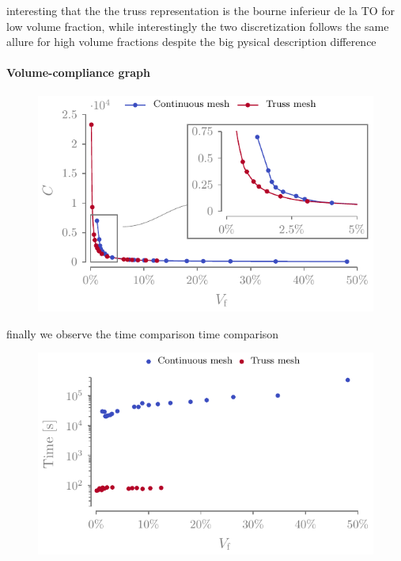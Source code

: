 interesting that the 
the truss representation is the bourne inferieur de la TO for low volume fraction, while interestingly the two discretization follows the same allure for high volume fractions despite the big pysical description difference

\paragraph{Volume-compliance graph}
\begin{figure}[]
    \centering
    \includegraphics{figures/03_comparison_TO_TTO/00_comp_vol/comp_vol.pdf}
    \caption{}
    \label{fig:03_comp_vol}
\end{figure}



finally we observe the time comparison time comparison

\begin{figure}[]
    \centering
    \includegraphics{figures/03_comparison_TO_TTO/00_time_vol/time_vol.pdf}
    \caption{}
    \label{fig:03_time_vol}
\end{figure}

